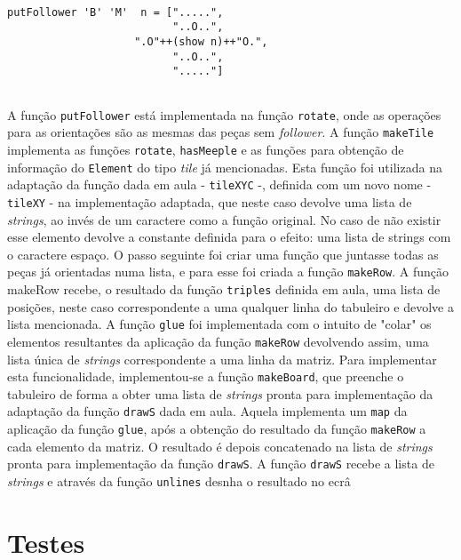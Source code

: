 \begin{verbatim}

putFollower 'B' 'M'  n = [".....",
                          "..O..",
                    ".O"++(show n)++"O.",
                          "..O..",
                          "....."]
                        
\end{verbatim}

A função  \texttt{putFollower} está implementada na  função \texttt{rotate}, onde as  operações para as
orientações  são  as  mesmas  das  peças sem  \emph{follower}.  A  função  \texttt{makeTile}  implementa
as  funções  \texttt{rotate},  \texttt{hasMeeple}  e  as   funções  para  obtenção  de  informação  do
\texttt{Element} do tipo \emph{tile}  já mencionadas. Esta função foi utilizada  na adaptação da função
dada  em aula - \texttt{tileXYC} -, definida com um novo nome - \texttt{tileXY} - na implementação  adaptada, que  neste caso
devolve uma  lista de \emph{strings},  ao invés de  um caractere  como a função  original. No caso  de não
existir  esse elemento  devolve a  constante definida  para o  efeito: uma  lista de  strings com  o caractere
espaço. O passo  seguinte foi criar uma  função que juntasse todas  as peças já orientadas  numa lista, e
para esse  foi criada  a função \texttt{makeRow}.  A função makeRow  recebe, o resultado da função \texttt{triples} definida em aula, uma lista de
posições, neste caso correspondente a uma qualquer linha do tabuleiro e devolve a lista mencionada. A função
\texttt{glue} foi implementada com o intuito de "colar" os elementos resultantes da aplicação da função
\texttt{makeRow} devolvendo assim, uma lista única de \emph{strings} correspondente a uma linha da matriz. Para implementar esta funcionalidade, implementou-se a função \texttt{makeBoard}, que preenche o tabuleiro de forma a obter uma lista de \emph{strings} pronta para
implementação da adaptação da função \texttt{drawS} dada em aula. Aquela implementa um \texttt{map} da
aplicação da função \texttt{glue}, após a obtenção do resultado da função \texttt{makeRow} a cada elemento da
matriz. O resultado é depois concatenado na lista de \emph{strings} pronta para implementação da função
\texttt{drawS}. A função \texttt{drawS} recebe a lista de \emph{strings} e através da função \texttt{unlines}
desnha o resultado no ecrâ





\section{Testes}

